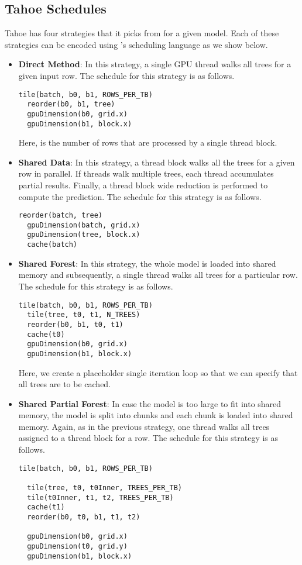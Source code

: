 \subsection{Tahoe Schedules}
Tahoe\cite{Tahoe} has four strategies that it picks from for a given model. 
Each of these strategies can be encoded using \Treebeard{}'s scheduling language
as we show below. 
\begin{itemize}
  \item \textbf{Direct Method}: In this strategy, a single GPU thread walks all trees
  for a given input row. The schedule for this strategy is as follows.
\begin{lstlisting}[style=c++]
  tile(batch, b0, b1, ROWS_PER_TB)
  reorder(b0, b1, tree)
  gpuDimension(b0, grid.x)
  gpuDimension(b1, block.x)
\end{lstlisting}
  Here,  is the number of rows that are processed by a single thread block.
  \item \textbf{Shared Data}: In this strategy, a thread block walks all the trees 
  for a given row in parallel. If threads walk multiple trees, each thread accumulates
  partial results. Finally, a thread block wide reduction is performed to compute 
  the prediction. The schedule for this strategy is as follows.
\begin{lstlisting}[style=c++]
  reorder(batch, tree)
  gpuDimension(batch, grid.x)
  gpuDimension(tree, block.x)
  cache(batch)
\end{lstlisting}
  \item \textbf{Shared Forest}: In this strategy, the whole model is loaded into 
  shared memory and subsequently, a single thread walks all trees for a particular
  row. The schedule for this strategy is as follows.
\begin{lstlisting}[style=c++]
  tile(batch, b0, b1, ROWS_PER_TB)
  tile(tree, t0, t1, N_TREES)
  reorder(b0, b1, t0, t1)
  cache(t0)
  gpuDimension(b0, grid.x)
  gpuDimension(b1, block.x)
\end{lstlisting}
  Here, we create a placeholder single iteration loop  so that we can 
  specify that all trees are to be cached.
  \item \textbf{Shared Partial Forest}: In case the model is too large to fit into
  shared memory, the model is split into chunks and each chunk is loaded into shared
  memory. Again, as in the previous strategy, one thread walks all trees assigned to
  a thread block for a row. The schedule for this strategy is as follows.
\begin{lstlisting}[style=c++]
  tile(batch, b0, b1, ROWS_PER_TB)
  
  tile(tree, t0, t0Inner, TREES_PER_TB)
  tile(t0Inner, t1, t2, TREES_PER_TB)
  cache(t1)
  reorder(b0, t0, b1, t1, t2)

  gpuDimension(b0, grid.x)
  gpuDimension(t0, grid.y)
  gpuDimension(b1, block.x)
\end{lstlisting}
\end{itemize}

